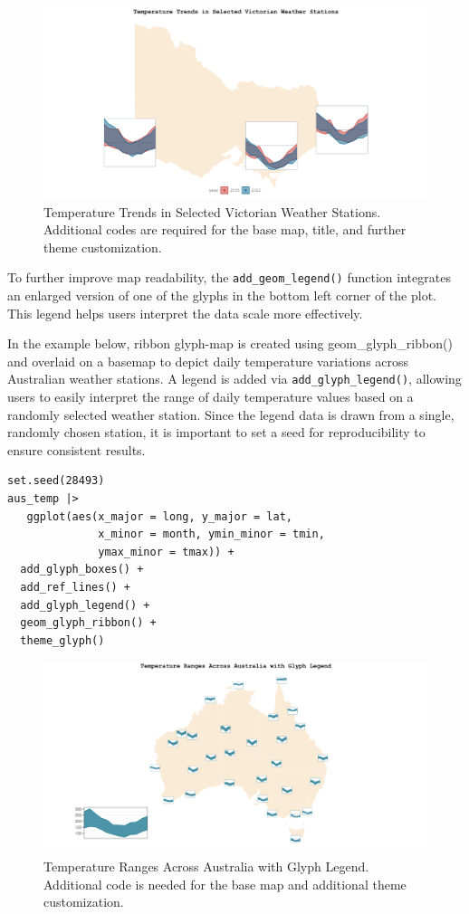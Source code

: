 \begin{figure}
\includegraphics[width=50in]{figures/hist_temp} \caption{Temperature Trends in Selected Victorian Weather Stations. Additional codes are required for the base map, title, and further theme customization.}\label{fig:unnamed-chunk-13}
\end{figure}

To further improve map readability, the \texttt{add\_geom\_legend()} function integrates an enlarged version of one of the glyphs in the bottom left corner of the plot. This legend helps users interpret the data scale more effectively.

In the example below, ribbon glyph-map is created using geom\_glyph\_ribbon() and overlaid on a basemap to depict daily temperature variations across Australian weather stations. A legend is added via \texttt{add\_glyph\_legend()}, allowing users to easily interpret the range of daily temperature values based on a randomly selected weather station. Since the legend data is drawn from a single, randomly chosen station, it is important to set a seed for reproducibility to ensure consistent results.

\begin{verbatim}
set.seed(28493)
aus_temp |>
   ggplot(aes(x_major = long, y_major = lat,
              x_minor = month, ymin_minor = tmin,
              ymax_minor = tmax)) +
  add_glyph_boxes() +
  add_ref_lines() +
  add_glyph_legend() +
  geom_glyph_ribbon() +
  theme_glyph() 
\end{verbatim}

\begin{figure}
\includegraphics[width=50in]{figures/legend_glyph} \caption{Temperature Ranges Across Australia with Glyph Legend. Additional code is needed for the base map and additional theme customization.}\label{fig:unnamed-chunk-15}
\end{figure}

